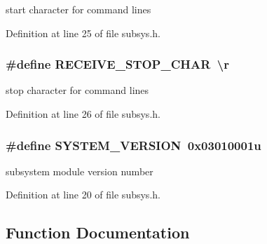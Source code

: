 start character for command lines 



Definition at line 25 of file subsys.\+h.

\hypertarget{group__subsys_ga37a39f2cef5d4f3989c8932c3d7346f6}{}
\subsubsection[{R\+E\+C\+E\+I\+V\+E\+\_\+\+S\+T\+O\+P\+\_\+\+C\+H\+A\+R}]{\setlength{\rightskip}{0pt plus 5cm}\#define R\+E\+C\+E\+I\+V\+E\+\_\+\+S\+T\+O\+P\+\_\+\+C\+H\+A\+R~\textquotesingle{}\textbackslash{}r\textquotesingle{}}\label{group__subsys_ga37a39f2cef5d4f3989c8932c3d7346f6}


stop character for command lines 



Definition at line 26 of file subsys.\+h.

\hypertarget{group__subsys_gac13b39d92263b3c765189651110c64f3}{}
\subsubsection[{S\+Y\+S\+T\+E\+M\+\_\+\+V\+E\+R\+S\+I\+O\+N}]{\setlength{\rightskip}{0pt plus 5cm}\#define S\+Y\+S\+T\+E\+M\+\_\+\+V\+E\+R\+S\+I\+O\+N~0x03010001u}\label{group__subsys_gac13b39d92263b3c765189651110c64f3}


subsystem module version number 



Definition at line 20 of file subsys.\+h.



\subsection{Function Documentation}
\hypertarget{group__subsys_ga6e52643db93bcc255c89cc27e644042d}{}

